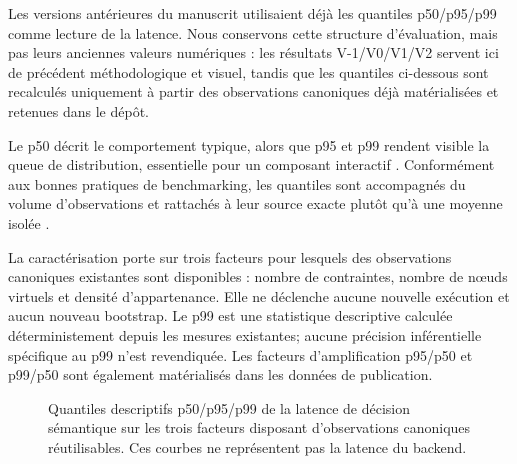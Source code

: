 Les versions antérieures du manuscrit utilisaient déjà les quantiles
p50/p95/p99 comme lecture de la latence. Nous conservons cette structure
d'évaluation, mais pas leurs anciennes valeurs numériques : les résultats
V-1/V0/V1/V2 servent ici de précédent méthodologique et visuel, tandis que
les quantiles ci-dessous sont recalculés uniquement à partir des observations
canoniques déjà matérialisées et retenues dans le dépôt.

Le p50 décrit le comportement typique, alors que p95 et p99 rendent visible
la queue de distribution, essentielle pour un composant interactif
\cite{DeanBarroso2013}. Conformément aux bonnes pratiques de benchmarking,
les quantiles sont accompagnés du volume d'observations et rattachés à leur
source exacte plutôt qu'à une moyenne isolée \cite{KaliberaJones2013}.

La caractérisation porte sur trois facteurs pour lesquels des observations
canoniques existantes sont disponibles : nombre de contraintes, nombre de
nœuds virtuels et densité d'appartenance. Elle ne déclenche aucune nouvelle
exécution et aucun nouveau bootstrap. Le p99 est une statistique descriptive
calculée déterministement depuis les mesures existantes; aucune précision
inférentielle spécifique au p99 n'est revendiquée. Les facteurs d'amplification
p95/p50 et p99/p50 sont également matérialisés dans les données de publication.



\begin{figure}[!t]
\centering
\begin{minipage}[t]{0.32\textwidth}
\centering

\end{minipage}\hfill
\begin{minipage}[t]{0.32\textwidth}
\centering

\end{minipage}\hfill
\begin{minipage}[t]{0.32\textwidth}
\centering

\end{minipage}
\caption{Quantiles descriptifs p50/p95/p99 de la latence de décision
sémantique sur les trois facteurs disposant d'observations canoniques
réutilisables. Ces courbes ne représentent pas la latence du backend.}
\label{fig:v4-semantic-latency-quantiles}
\end{figure}

